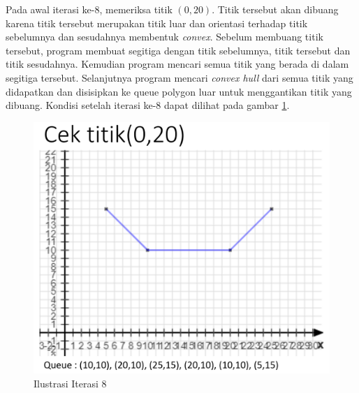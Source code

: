 \par Pada awal iterasi ke-8, memeriksa titik $(0,20)$. Titik tersebut akan dibuang karena titik tersebut merupakan titik luar dan orientasi terhadap titik sebelumnya dan sesudahnya membentuk \textit{convex}. Sebelum membuang titik tersebut, program membuat segitiga dengan titik sebelumnya, titik tersebut dan titik sesudahnya. Kemudian program mencari semua titik yang berada di dalam segitiga tersebut. Selanjutnya program mencari \textit{convex hull} dari semua titik yang didapatkan dan disisipkan ke queue polygon luar untuk menggantikan titik yang dibuang. Kondisi setelah iterasi ke-8 dapat dilihat pada gambar \ref{fig:iterasi-8}.
\begin{figure}[!h]
	\Centering
	\includegraphics [width=\columnwidth]{bab5/img/iterasi-8}
	\caption {Ilustrasi Iterasi 8}
	\label {fig:iterasi-8}
\end{figure}

